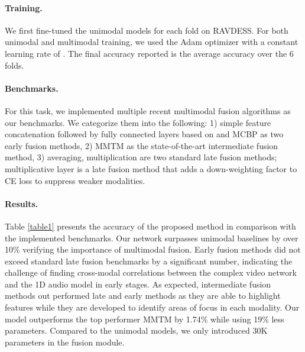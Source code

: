 \documentclass[10pt,twocolumn,letterpaper]{article}
\begin{document}
\paragraph{Training.}
We first fine-tuned the unimodal models for each fold on RAVDESS. For both unimodal and multimodal training, we used the Adam optimizer \cite{kingma2014adam} with a constant learning rate of . The final accuracy reported is the average accuracy over the 6 folds.  

\paragraph{Benchmarks.}
For this task, we implemented multiple recent multimodal fusion algorithms as our benchmarks. We categorize them into the following: 1) simple feature concatenation followed by fully connected layers based on \cite{ortega2019multimodal} and MCBP \cite{fukui2016multimodal} as two early fusion methods, 2) MMTM \cite{joze2020mmtm} as the state-of-the-art intermediate fusion method, 3) averaging, multiplication are two standard late fusion methods; multiplicative layer \cite{liu2018learn} is a late fusion method that adds a down-weighting factor to CE loss to suppress weaker modalities.

\paragraph{Results.}
Table \ref{table1} presents the accuracy of the proposed method in comparison with the implemented benchmarks. Our network surpasses unimodal baselines by over 10\% verifying the importance of multimodal fusion. Early fusion methods did not exceed standard late fusion benchmarks by a significant number, indicating the challenge of finding cross-modal correlations between the complex video network and the 1D audio model in early stages. As expected, intermediate fusion methods out performed late and early methods as they are able to highlight features while they are developed to identify areas of focus in each modality. Our model outperforms the top performer MMTM by 1.74\% while using 19\% less parameters. Compared to the unimodal models, we only introduced 30K parameters in the fusion module.
\end{document}
